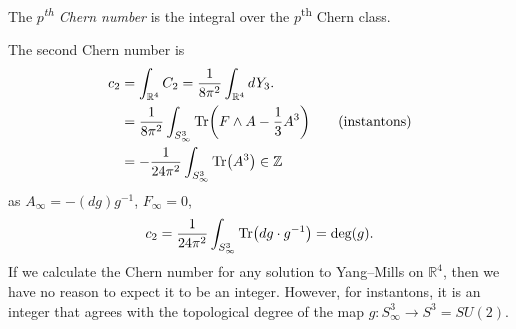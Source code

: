 \begin{definition}
  The \emph{$p$\textsuperscript{th} Chern number} is the integral over the $p$\textsuperscript{th} Chern class.
\end{definition}
The second Chern number is
\begin{align}
  c_2 &= \int_{\mathbb{R}^4} C_2 = \frac{1}{8 \pi^2} \int_{\mathbb{R}^4} d Y_3. \\
      &= \frac{1}{8 \pi^2} \int_{S^3_{\infty}} \Tr(F \wedge A - \frac{1}{3} A^3) \qquad \text{(instantons)} \\
      &= -\frac{1}{24 \pi^2} \int_{S^3_{\infty}} \Tr(A^3) \in \mathbb{Z}
\end{align}
as $A_{\infty} = - (dg) g^{-1}$, $F_{\infty} = 0$,
\begin{equation}
  c_2 = \frac{1}{24 \pi^2} \int_{S_{\infty}^3} \Tr(dg \cdot g^{-1}) = \text{deg}(g).
\end{equation}
If we calculate the Chern number for any solution to Yang--Mills on $\mathbb{R}^4$, then we have no reason to expect it to be an integer.
However, for instantons, it is an integer that agrees with the topological degree of the map $g \colon S^3_{\infty} \to S^3 = SU(2)$.

